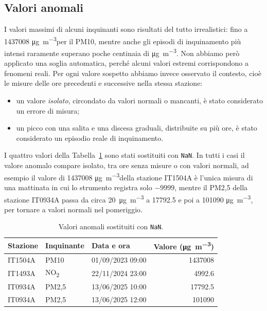 \documentclass[11pt]{report}
\newcommand{\ugm}{\si{\micro\gram\per\cubic\metre}}
\begin{document}
\subsection{Valori anomali}
I valori massimi di alcuni inquinanti sono risultati del tutto irrealistici:
fino a \num{1437008} \ugm per il PM10, mentre anche gli episodi di inquinamento
più intensi raramente superano poche centinaia di \ugm. Non abbiamo però
applicato una soglia automatica, perché alcuni valori estremi corrispondono a
fenomeni reali. Per ogni valore sospetto abbiamo invece osservato il contesto,
cioè le misure delle ore precedenti e successive nella stessa stazione:
\begin{itemize}
  \item un valore \emph{isolato}, circondato da valori normali o mancanti, è stato
        considerato un errore di misura;
  \item un picco con una salita e una discesa graduali, distribuite su più ore, è stato
        considerato un episodio reale di inquinamento.
\end{itemize}

I quattro valori della Tabella~\ref{tab:anomali} sono stati sostituiti con
\texttt{NaN}. In tutti i casi il valore anomalo compare isolato, tra ore senza
misure o con valori normali, ad esempio il valore di \num{1437008} \ugm della
stazione IT1504A è l'unica misura di una mattinata in cui lo strumento registra
solo $-9999$, mentre il PM2,5 della stazione IT0934A passa da circa
\SI{20}{\micro\gram\per\cubic\metre} a \num{17792,5} e poi a \num{101090} \ugm,
per tornare a valori normali nel pomeriggio.

\begin{table}[H]
  \centering
  \caption{Valori anomali sostituiti con \texttt{NaN}.}
  \label{tab:anomali}
  \begin{tabular}{l l l r}
    \toprule
    \textbf{Stazione} & \textbf{Inquinante} & \textbf{Data e ora} & \textbf{Valore (\ugm)} \\
    \midrule
    IT1504A           & PM10                & 01/09/2023 09:00    & \num{1437008}          \\
    IT1493A           & NO\textsubscript{2} & 22/11/2024 23:00    & \num{4992.6}           \\
    IT0934A           & PM2,5               & 13/06/2025 10:00    & \num{17792.5}          \\
    IT0934A           & PM2,5               & 13/06/2025 12:00    & \num{101090}           \\
    \bottomrule
  \end{tabular}
\end{table}
\end{document}
